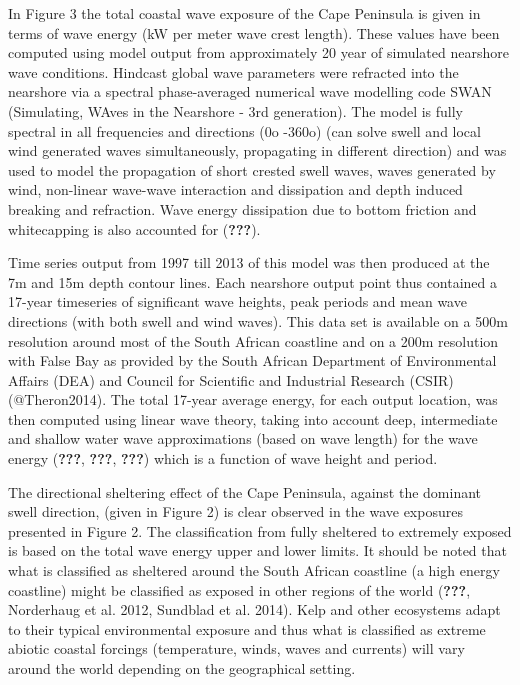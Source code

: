 \documentclass[10pt,a4,]{article}
\begin{document}
In Figure 3 the total coastal wave exposure of the Cape Peninsula is
given in terms of wave energy (kW per meter wave crest length). These
values have been computed using model output from approximately 20 year
of simulated nearshore wave conditions. Hindcast global wave parameters
were refracted into the nearshore via a spectral phase-averaged
numerical wave modelling code SWAN (Simulating, WAves in the Nearshore -
3rd generation). The model is fully spectral in all frequencies and
directions (0o -360o) (can solve swell and local wind generated waves
simultaneously, propagating in different direction) and was used to
model the propagation of short crested swell waves, waves generated by
wind, non-linear wave-wave interaction and dissipation and depth induced
breaking and refraction. Wave energy dissipation due to bottom friction
and whitecapping is also accounted for ({\textbf{???}}).

Time series output from 1997 till 2013 of this model was then produced
at the 7m and 15m depth contour lines. Each nearshore output point thus
contained a 17-year timeseries of significant wave heights, peak periods
and mean wave directions (with both swell and wind waves). This data set
is available on a 500m resolution around most of the South African
coastline and on a 200m resolution with False Bay as provided by the
South African Department of Environmental Affairs (DEA) and Council for
Scientific and Industrial Research (CSIR)(@Theron2014). The total
17-year average energy, for each output location, was then computed
using linear wave theory, taking into account deep, intermediate and
shallow water wave approximations (based on wave length) for the wave
energy ({\textbf{???}}, {\textbf{???}}, {\textbf{???}}) which is a
function of wave height and period.

The directional sheltering effect of the Cape Peninsula, against the
dominant swell direction, (given in Figure 2) is clear observed in the
wave exposures presented in Figure 2. The classification from fully
sheltered to extremely exposed is based on the total wave energy upper
and lower limits. It should be noted that what is classified as
sheltered around the South African coastline (a high energy coastline)
might be classified as exposed in other regions of the world
({\textbf{???}}, Norderhaug et al. 2012, Sundblad et al. 2014). Kelp and
other ecosystems adapt to their typical environmental exposure and thus
what is classified as extreme abiotic coastal forcings (temperature,
winds, waves and currents) will vary around the world depending on the
geographical setting.
\end{document}
